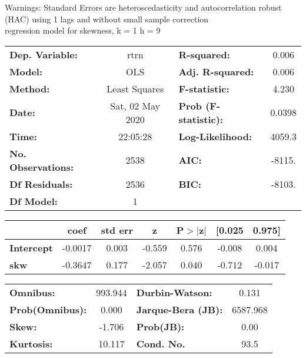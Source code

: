 Warnings: \newline
 [1] Standard Errors are heteroscedasticity and autocorrelation robust (HAC) using 1 lags and without small sample correction\\ 

regression model for skewness, k = 1 h = 9\begin{center}
\begin{tabular}{lclc}
\toprule
\textbf{Dep. Variable:}    &       rtrn       & \textbf{  R-squared:         } &     0.006   \\
\textbf{Model:}            &       OLS        & \textbf{  Adj. R-squared:    } &     0.006   \\
\textbf{Method:}           &  Least Squares   & \textbf{  F-statistic:       } &     4.230   \\
\textbf{Date:}             & Sat, 02 May 2020 & \textbf{  Prob (F-statistic):} &   0.0398    \\
\textbf{Time:}             &     22:05:28     & \textbf{  Log-Likelihood:    } &    4059.3   \\
\textbf{No. Observations:} &        2538      & \textbf{  AIC:               } &    -8115.   \\
\textbf{Df Residuals:}     &        2536      & \textbf{  BIC:               } &    -8103.   \\
\textbf{Df Model:}         &           1      & \textbf{                     } &             \\
\bottomrule
\end{tabular}
\begin{tabular}{lcccccc}
                   & \textbf{coef} & \textbf{std err} & \textbf{z} & \textbf{P$> |$z$|$} & \textbf{[0.025} & \textbf{0.975]}  \\
\midrule
\textbf{Intercept} &      -0.0017  &        0.003     &    -0.559  &         0.576        &       -0.008    &        0.004     \\
\textbf{skw}       &      -0.3647  &        0.177     &    -2.057  &         0.040        &       -0.712    &       -0.017     \\
\bottomrule
\end{tabular}
\begin{tabular}{lclc}
\textbf{Omnibus:}       & 993.944 & \textbf{  Durbin-Watson:     } &    0.131  \\
\textbf{Prob(Omnibus):} &   0.000 & \textbf{  Jarque-Bera (JB):  } & 6587.968  \\
\textbf{Skew:}          &  -1.706 & \textbf{  Prob(JB):          } &     0.00  \\
\textbf{Kurtosis:}      &  10.117 & \textbf{  Cond. No.          } &     93.5  \\
\bottomrule
\end{tabular}
\end{center}

